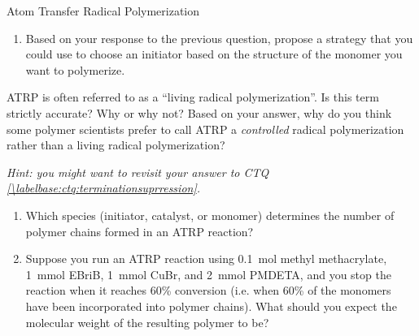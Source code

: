 \begin{activity}{Atom Transfer Radical Polymerization}
\begin{ctqs}
\begin{enumerate}
			\item Based on your response to the previous question, propose a strategy that you could use to choose an initiator based on the structure of the monomer you want to polymerize.
	
			\begin{solution}[2in]
			\end{solution}
			
		\end{enumerate}
		
		
		
		
\end{ctqs}


\begin{exercises}

	\exercise ATRP is often referred to as a ``living radical polymerization''.  Is this term strictly accurate?  Why or why not?  Based on your answer, why do you think some polymer scientists prefer to call ATRP a \emph{controlled} radical polymerization rather than a living radical polymerization?
	
		\emph{Hint: you might want to revisit your answer to CTQ \ref{\labelbase:ctq:terminationsuprression}.}
		
	\exercise 
	
		\begin{enumerate}
	
			\item Which species (initiator, catalyst, or monomer) determines the number of polymer chains formed in an ATRP reaction?
	
			\item Suppose you run an ATRP reaction using 0.1~mol methyl methacrylate, 1~mmol EBriB, 1~mmol CuBr, and 2~mmol PMDETA, and you stop the reaction when it reaches 60\% conversion (i.e. when 60\% of the monomers have been incorporated into polymer chains).  What should you expect the molecular weight of the resulting polymer to be?
			

\end{enumerate}
\end{exercises}
\end{activity}
